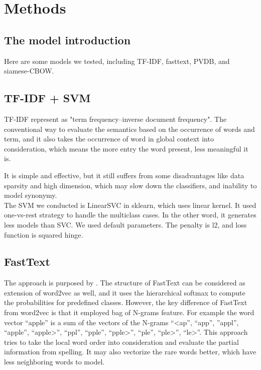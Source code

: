\chapter{Methods}

\section{The model introduction}

Here are some models we tested, including TF-IDF, fasttext, PVDB, and siamese-CBOW.

\section{TF-IDF + SVM}

	TF-IDF represent as "term frequency–inverse document frequency". The conventional way to evaluate the semantics based on the occurrence of words and term, 
  and it also takes the occurrence of word in global context into consideration, which means the more entry the word present, less meaningful it is.

  It is simple and effective, but it still suffers from some disadvantages like data sparsity and high dimension, which may slow down the classifiers, and inability to model synonymy. \\

  The SVM we conducted is LinearSVC in sklearn, which uses linear kernel. It used one-vs-rest strategy to handle the multiclass cases.
  In the other word, it generates less models than SVC.
  We used default parameters. The penalty is l2, and loss function is squared hinge. 

\section{FastText}
	
The approach is purposed by \cite{joulin2016fasttext}. 
The structure of FastText can be considered as extension of word2vec as well, and it uses the hierarchical softmax to compute the probabilities for predefined classes. 
However, the key difference of FastText from word2vec is that it employed bag of N-grams feature. 
For example the word vector “apple” is a sum of the vectors of the N-grams “<ap”, “app”, ”appl”, “apple”, “apple>”, “ppl”, “pple”, “pple>”, “ple”, “ple>”, “le>”.
This approach tries to take the local word order into consideration and evaluate the partial information from spelling. It may also vectorize the rare words better, which have less neighboring words to model.

